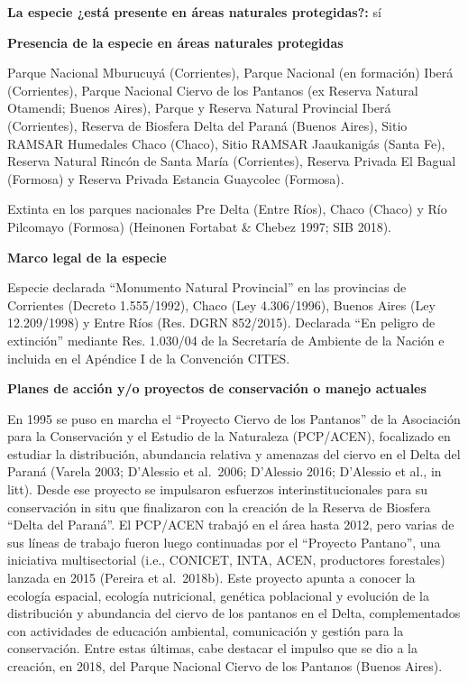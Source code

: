 \documentclass[
  x11names]{article}
\begin{document}
%
\begin{table}[H]
\centering
\begin{tabular}[t]{>{\raggedright\arraybackslash}m{16cm}>{}m{16cm}}
\toprule
\cellcolor{ceil}{\textcolor{white}{\textbf{\rule{0pt}{14pt}CONSERVACIÓN E INVESTIGACIÓN}}}\\
\bottomrule
\end{tabular}
\end{table}

\textbf{La especie ¿está presente en áreas naturales protegidas?:} sí

\textbf{Presencia de la especie en áreas naturales protegidas}

Parque Nacional Mburucuyá (Corrientes), Parque Nacional (en formación)
Iberá (Corrientes), Parque Nacional Ciervo de los Pantanos (ex Reserva
Natural Otamendi; Buenos Aires), Parque y Reserva Natural Provincial
Iberá (Corrientes), Reserva de Biosfera Delta del Paraná (Buenos Aires),
Sitio RAMSAR Humedales Chaco (Chaco), Sitio RAMSAR Jaaukanigás (Santa
Fe), Reserva Natural Rincón de Santa María (Corrientes), Reserva Privada
El Bagual (Formosa) y Reserva Privada Estancia Guaycolec (Formosa).

Extinta en los parques nacionales Pre Delta (Entre Ríos), Chaco (Chaco)
y Río Pilcomayo (Formosa) (Heinonen Fortabat \& Chebez 1997; SIB 2018).

\textbf{Marco legal de la especie}

Especie declarada ``Monumento Natural Provincial'' en las provincias de
Corrientes (Decreto 1.555/1992), Chaco (Ley 4.306/1996), Buenos Aires
(Ley 12.209/1998) y Entre Ríos (Res. DGRN 852/2015). Declarada ``En
peligro de extinción'' mediante Res. 1.030/04 de la Secretaría de
Ambiente de la Nación e incluida en el Apéndice I de la Convención
CITES.

\textbf{Planes de acción y/o proyectos de conservación o manejo
actuales}

En 1995 se puso en marcha el ``Proyecto Ciervo de los Pantanos'' de la
Asociación para la Conservación y el Estudio de la Naturaleza
(PCP/ACEN), focalizado en estudiar la distribución, abundancia relativa
y amenazas del ciervo en el Delta del Paraná (Varela 2003; D'Alessio et
al.~2006; D'Alessio 2016; D'Alessio et al., in litt). Desde ese proyecto
se impulsaron esfuerzos interinstitucionales para su conservación in
situ que finalizaron con la creación de la Reserva de Biosfera ``Delta
del Paraná''. El PCP/ACEN trabajó en el área hasta 2012, pero varias de
sus líneas de trabajo fueron luego continuadas por el ``Proyecto
Pantano'', una iniciativa multisectorial (i.e., CONICET, INTA, ACEN,
productores forestales) lanzada en 2015 (Pereira et al.~2018b). Este
proyecto apunta a conocer la ecología espacial, ecología nutricional,
genética poblacional y evolución de la distribución y abundancia del
ciervo de los pantanos en el Delta, complementados con actividades de
educación ambiental, comunicación y gestión para la conservación. Entre
estas últimas, cabe destacar el impulso que se dio a la creación, en
2018, del Parque Nacional Ciervo de los Pantanos (Buenos Aires).
\end{document}
